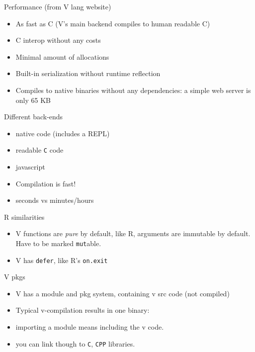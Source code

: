 \documentclass[
  ignorenonframetext,
]{beamer}
\providecommand{\tightlist}{%
  \setlength{\itemsep}{0pt}\setlength{\parskip}{0pt}}
\begin{document}
\begin{frame}[fragile]{Performance (from V lang website)}
\protect\hypertarget{performance-from-v-lang-website}{}
\begin{itemize}
\tightlist
\item
  As fast as C (V's main backend compiles to human readable C)
\item
  C interop without any costs
\item
  Minimal amount of allocations
\item
  Built-in serialization without runtime reflection
\item
  Compiles to native binaries without any dependencies: a simple web
  server is only 65 KB
\end{itemize}

\begin{block}{Different back-ends}
\protect\hypertarget{different-back-ends}{}
\begin{itemize}
\tightlist
\item
  native code (includes a REPL)
\item
  readable \texttt{C} code
\item
  javascript
\end{itemize}
\end{block}

\begin{block}{}
\protect\hypertarget{section-1}{}
\begin{itemize}
\tightlist
\item
  Compilation is fast!
\item
  seconds vs minutes/hours
\end{itemize}
\end{block}
\end{frame}

\begin{frame}[fragile]{R similarities}
\protect\hypertarget{r-similarities}{}
\begin{itemize}
\tightlist
\item
  V functions are \emph{pure} by default, like R, arguments are
  immutable by default. Have to be marked \texttt{mut}able.
\item
  V has \texttt{defer}, like R's \texttt{on.exit}
\end{itemize}
\end{frame}

\begin{frame}[fragile]{V pkgs}
\protect\hypertarget{v-pkgs}{}
\begin{itemize}
\tightlist
\item
  V has a module and pkg system, containing v src code (not compiled)
\item
  Typical v-compilation results in one binary:
\item
  importing a module means including the v code.
\item
  you can link though to \texttt{C}, \texttt{CPP} libraries.
\end{itemize}
\end{frame}
\end{document}
